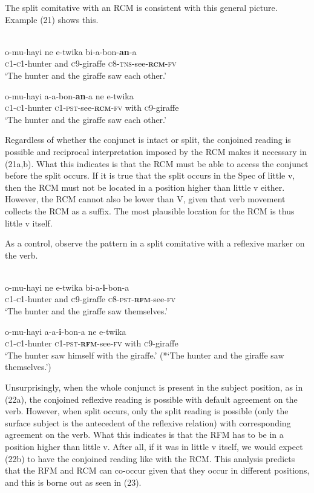 \documentclass[output=paper]{langsci/langscibook}
\begin{document}
  The split comitative with an RCM is consistent with this general picture. Example (21) shows this.


\ea\label{ex:}
  \\
\ea
\gll  o-mu-hayi   ne   e-twika   bi-a-bon-\textbf{an}-a  \\
       \textsc{c1-c1}-hunter   and   \textsc{c}9-giraffe   \textsc{c8-tns}-see-\textbf{\textsc{rcm}}\textsc{-fv} \\
\glt   ‘The hunter and the giraffe saw each other.’

\ex
\gll   o-mu-hayi     a-a-bon-\textbf{an}-a     ne   e-twika\\
       \textsc{c1-c1}-hunter    \textsc{c1-pst}-see-\textbf{\textsc{rcm}}\textsc{-fv}  with  \textsc{c}9-giraffe   \\
\glt   ‘The hunter and the giraffe saw each other.’
\z
\z

Regardless of whether the conjunct is intact or split, the conjoined reading is possible and reciprocal interpretation imposed by the RCM makes it necessary in (21a,b). What this indicates is that the RCM must be able to access the conjunct before the split occurs. If it is true that the split occurs in the Spec of little v, then the RCM must not be located in a position higher than little v either. However, the RCM cannot also be lower than V, given that verb movement collects the RCM as a suffix. The most plausible location for the RCM is thus little v itself. 

  As a control, observe the pattern in a split comitative with a reflexive marker on the verb. 


\ea\label{ex:}
  \\
\ea
\gll  o-mu-hayi   ne   e-twika   bi-a-\textbf{{i}}{-bon-a}  \\
       \textsc{c1-c1}-hunter   and   \textsc{c}9-giraffe   \textsc{c}8-\textsc{pst-}\textbf{\textsc{rfm}}-see-\textsc{fv} \\
\glt   ‘The hunter and the giraffe saw themselves.’

\ex
\gll  o-mu-hayi   a-a-\textbf{i}-bon-a     ne   e-twika \\
       \textsc{c1-c1}-hunter  \textsc{c}1-\textsc{pst-}\textbf{\textsc{rfm}}-see-\textsc{fv}   with   \textsc{c}9-giraffe \\
\glt   ‘The hunter saw himself with the giraffe.’
\glt   (*‘The hunter and the giraffe saw themselves.’)
\z
\z

Unsurprisingly, when the whole conjunct is present in the subject position, as in (22a), the conjoined reflexive reading is possible with default agreement on the verb. However, when split occurs, only the split reading is possible (only the surface subject is the antecedent of the reflexive relation) with corresponding agreement on the verb. What this indicates is that the RFM has to be in a position higher than little v. After all, if it was in little v itself, we would expect (22b) to have the conjoined reading like with the RCM. This analysis predicts that the RFM and RCM can co-occur given that they occur in different positions, and this is borne out as seen in (23).
\end{document}
